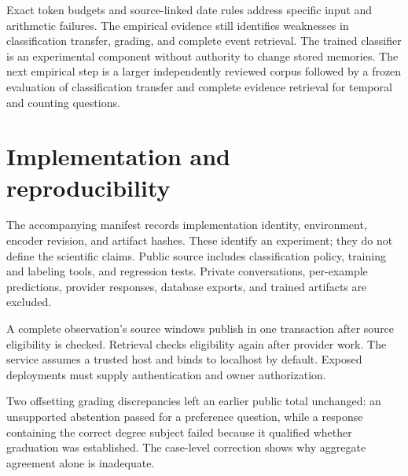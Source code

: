 \documentclass[11pt]{article}
\begin{document}
Exact token budgets and source-linked date rules address specific input and arithmetic failures. The empirical evidence still identifies weaknesses in classification transfer, grading, and complete event retrieval. The trained classifier is an experimental component without authority to change stored memories. The next empirical step is a larger independently reviewed corpus followed by a frozen evaluation of classification transfer and complete evidence retrieval for temporal and counting questions.

\appendix
\section{Implementation and reproducibility}
The accompanying manifest records implementation identity, environment, encoder revision, and artifact hashes. These identify an experiment; they do not define the scientific claims. Public source includes classification policy, training and labeling tools, and regression tests. Private conversations, per-example predictions, provider responses, database exports, and trained artifacts are excluded.

A complete observation's source windows publish in one transaction after source eligibility is checked. Retrieval checks eligibility again after provider work. The service assumes a trusted host and binds to localhost by default. Exposed deployments must supply authentication and owner authorization.

Two offsetting grading discrepancies left an earlier public total unchanged: an unsupported abstention passed for a preference question, while a response containing the correct degree subject failed because it qualified whether graduation was established. The case-level correction shows why aggregate agreement alone is inadequate.

\clearpage


\end{document}
